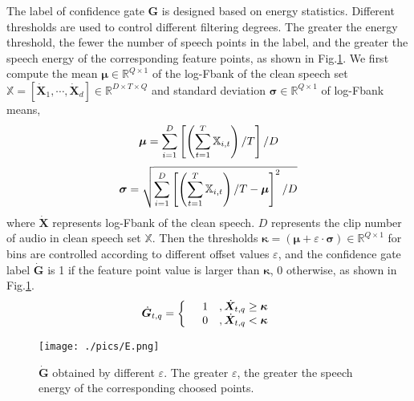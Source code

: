 \documentclass{article}
\begin{document}
	The label of confidence gate $\bm{G}$ is designed based on energy statistics. Different thresholds are used to control different filtering degrees. The greater the energy threshold, the fewer the number of speech points in the label, and the greater the speech energy of the corresponding feature points, as shown in Fig.\ref{E}. We first compute the mean $\bm{\mu} \in \mathbb{R}^{Q \times 1}$ of the log-Fbank of the clean speech set $\bm{\mathbb{X}}=[\dot{\bm{X}}_1,\cdots,\dot{\bm{X}}_d] \in \mathbb{R}^{D\times T \times Q}$ and standard deviation $\bm{\sigma} \in \mathbb{R}^{Q \times 1}$ of log-Fbank means, 
	\begin{equation}
		\setlength{\abovedisplayskip}{3pt}
		\setlength{\belowdisplayskip}{3pt}
		\bm{\mu} = \sum_{i=1}^{D}\left[\left(\sum_{t=1}^{T}\bm{\mathbb{X}}_{i,t}\right)/T\right]/D
	\end{equation}
	\begin{equation}
		\setlength{\abovedisplayskip}{3pt}
		\setlength{\belowdisplayskip}{3pt}
		\bm{\sigma} = \sqrt{\sum_{i=1}^{D}\left[\left(\sum_{t=1}^{T}\bm{\mathbb{X}}_{i,t}\right)/T-\bm{\mu}\right]^2/D}
	\end{equation}
	where $\dot{\bm{X}}$ represents log-Fbank of the clean speech. $D$ represents the clip number of audio in clean speech set $\bm{\mathbb{X}}$. Then the thresholds $\bm{\kappa}=(\bm{\mu}+\varepsilon \cdot \bm{\sigma})\in \mathbb{R}^{Q \times 1}$ for bins are controlled according to different offset values $\varepsilon$, and the confidence gate label $\dot{\bm{G}}$ is 1 if the feature point value is larger than $\bm{\kappa}$, 0 otherwise, as shown in Fig.\ref{E}.
	\begin{equation}
		\setlength{\abovedisplayskip}{3pt}
		\setlength{\belowdisplayskip}{3pt}
		\label{confidencelabel}
		\dot{\bm{G}}_{t,q} = 
		\left\{
		\begin{array}{rcl}
			& 1 &, \dot{\bm{X}}_{t,q} \ge \bm{\kappa}  \\
			& 0 &, \dot{\bm{X}}_{t,q} < \bm{\kappa}
		\end{array}
		\right.
	\end{equation}
	
	
	\begin{figure}[htb]
		\centering
		\vspace{-0.4cm}
		\texttt{[image: ./pics/E.png]}
		\vspace{-1em}
		\caption{$\dot{\bm{G}}$ obtained by different $\varepsilon$. The greater $\varepsilon$, the greater the speech energy of the corresponding choosed points.}
		\label{E}
	\end{figure}
\end{document}

